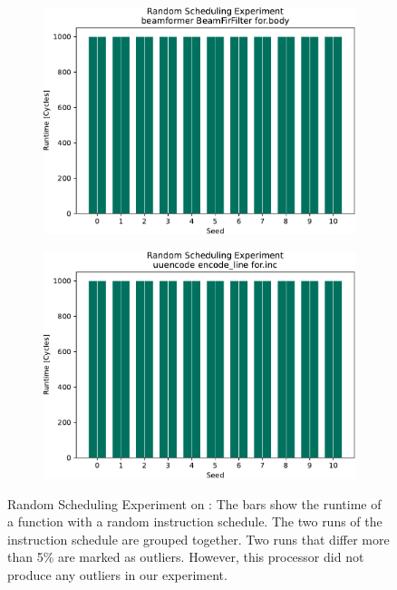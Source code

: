 \begin{figure}
\begin{subfigure}{0.45\textwidth}
        \includegraphics[width=\textwidth]{img/random-scheduling-experiment-aurora-collected/beamformer-crop.pdf}
        \caption{}
        \label{fig:eval:rndm:aurora:e}
    \end{subfigure}
    \hfill
    \begin{subfigure}{0.45\textwidth}
        \includegraphics[width=\textwidth]{img/random-scheduling-experiment-aurora-collected/uuencode-crop.pdf}
        \caption{}
        \label{fig:eval:rndm:aurora:f}
    \end{subfigure}
    \caption[Random Scheduling Experiment on \aurora]{Random Scheduling Experiment on \aurora:
    The bars show the runtime of a function with a random instruction schedule.
    The two runs of the instruction schedule are grouped together.
    Two runs that differ more than 5\% are marked as outliers.
    However, this processor did not produce any outliers in our experiment.}
    \label{fig:eval:rndm:aurora}
\end{figure}

